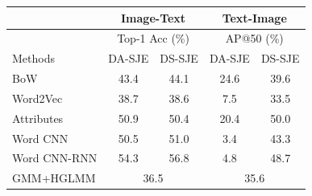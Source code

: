\setlength{\tabcolsep}{3pt}
\begin{table}[]
\small
\centering
\begin{tabular}{|l|c|c|c|c|}
\hline
             & \multicolumn{2}{c|}{Image-Text} & \multicolumn{2}{c|}{Text-Image}                           \\ \hline
             & \multicolumn{2}{c|}{Top-1 Acc (\%)} & \multicolumn{2}{c|}{AP@50 (\%)}                           \\ \hline
Methods      & DA-SJE        & DS-SJE              & DA-SJE                      & DS-SJE                      \\ \hline
BoW \cite{harris1954distributional} & 43.4          & 44.1                & 24.6                        & 39.6                        \\ \hline
Word2Vec \cite{mikolov2013distributed}     & 38.7          & 38.6                & 7.5                         & 33.5                        \\ \hline
Attributes \cite{akata2015evaluation}   & 50.9          & 50.4                & 20.4                        & 50.0                        \\ \hline
Word CNN \cite{reed2016learning}    & 50.5          & 51.0                & 3.4                         & 43.3                        \\ \hline
Word CNN-RNN \cite{reed2016learning}  & 54.3          & 56.8                & 4.8                         & 48.7                        \\ \hline
GMM+HGLMM \cite{klein2015associating} & \multicolumn{2}{c|}{36.5}           & \multicolumn{2}{c|}{35.6} \\ \hline

\end{tabular}
\end{table}
